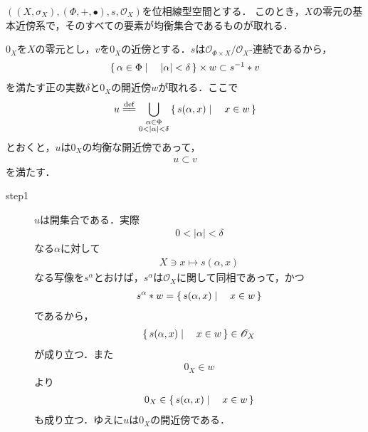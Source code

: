 	\begin{screen}
		\begin{thm}[均衡な局所基が取れる]
			$\left(\left(X,\sigma_X\right),(\Phi,+,\bullet),s,\mathscr{O}_X\right)$を位相線型空間とする．
			このとき，$X$の零元の基本近傍系で，そのすべての要素が均衡集合であるものが取れる．
		\end{thm}
	\end{screen}
	
	\begin{sketch}
		$0_X$を$X$の零元とし，$v$を$0_X$の近傍とする．$s$は$\mathscr{O}_{\Phi \times X}/\mathscr{O}_X$-連続であるから，
		\begin{align}
			\left\{\, \alpha \in \Phi \mid \quad |\alpha| < \delta\, \right\} \times w \subset s^{-1} \ast v
		\end{align}
		を満たす正の実数$\delta$と$0_X$の開近傍$w$が取れる．ここで
		\begin{align}
			u \defeq \bigcup_{\substack{\alpha \in \Phi \\ 0 < |\alpha| < \delta}} \Set{s(\alpha,x)}{x \in w}
		\end{align}
		とおくと，$u$は$0_X$の均衡な開近傍であって，
		\begin{align}
			u \subset v
		\end{align}
		を満たす．
		\begin{description}
			\item[step1] $u$は開集合である．実際
				\begin{align}
					0 < |\alpha| < \delta
				\end{align}
				なる$\alpha$に対して
				\begin{align}
					X \ni x \longmapsto s(\alpha,x)
				\end{align}
				なる写像を$s^\alpha$とおけば，$s^\alpha$は$\mathscr{O}_X$に関して同相であって，かつ
				\begin{align}
					s^\alpha \ast w = \left\{\, s(\alpha,x) \mid \quad x \in w\, \right\}
				\end{align}
				であるから，
				\begin{align}
					\left\{\, s(\alpha,x) \mid \quad x \in w\, \right\} \in \mathscr{O}_X
				\end{align}
				が成り立つ．また
				\begin{align}
					0_X \in w
				\end{align}
				より
				\begin{align}
					0_X \in \left\{\, s(\alpha,x) \mid \quad x \in w\, \right\}
				\end{align}
				も成り立つ．ゆえに$u$は$0_X$の開近傍である．
				

\end{description}
\end{sketch}
